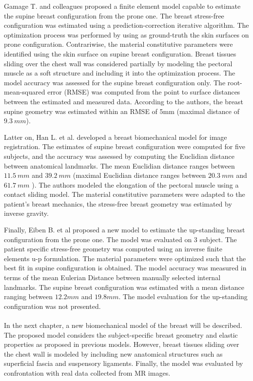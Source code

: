  Gamage T. and colleagues \citep{gamage_modelling_2012} proposed a finite element model capable to estimate the supine breast configuration from the prone one. The breast stress-free configuration was estimated using a prediction-correction iterative algorithm. The optimization process was performed by using as ground-truth the skin surfaces on prone configuration. Contrariwise, the material constitutive parameters were identified using the skin surface on supine breast configuration. Breast tissues sliding over the chest wall was considered partially by modeling the pectoral muscle as a soft structure and including it into the optimization process. The model accuracy was assessed for the supine breast configuration only. The root-mean-squared error (RMSE) was computed from the point to surface distances between the estimated and measured data. According to the authors, the breast supine geometry was estimated within an RMSE of 5mm (maximal distance of $9.3\ mm$). 

Latter on, Han L. et al. \citep{han_nonlinear_2014} developed a breast biomechanical model for image registration. The estimates of supine breast configuration were computed for five subjects, and the accuracy was assessed by computing the Euclidian distance between anatomical landmarks.  The mean Euclidian distance ranges between $11.5\ mm$ and $39.2\ mm$ (maximal Euclidian distance ranges between $20.3\ mm$ and $61.7\ mm$ ). The authors modeled the elongation of the pectoral muscle using a contact sliding model. The material constitutive parameters were adapted to the patient’s breast mechanics, the stress-free breast geometry was estimated by inverse gravity. 

Finally, Eiben B. et al \citep{eiben_surface_2016} proposed a new model to estimate the up-standing breast configuration from the prone one. The model was evaluated on 3 subject. The patient specific stress-free geometry was computed using an inverse finite elements u-p formulation. The material parameters were optimized such that the best fit in supine configuration is obtained. The model accuracy was measured in terms of the mean Eulerian Distance between manually selected internal landmarks. The supine breast configuration was estimated with a mean distance ranging between $12.2mm$ and $19.8 mm$. The model evaluation for the up-standing configuration was not presented.\\
\\

In the next chapter, a new biomechanical model of the breast will be described. The proposed model considers the subject-specific breast geometry and elastic properties as proposed in previous models. However,  breast tissues sliding over the chest wall is modeled by including new anatomical structures such as superficial fascia and suspensory ligaments. Finally, the model was evaluated by confrontation with real data collected from MR images.        
 
 

